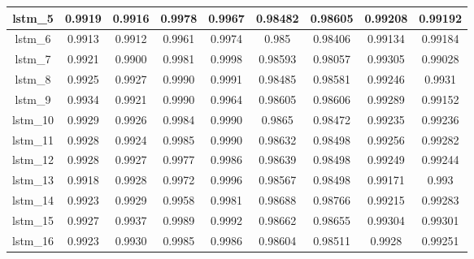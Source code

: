 \begin{table}[p]
\begin{tabular} {|c|c|c|c|c|c|c|c|c| }
        lstm\_5  & 0.9919                        & 0.9916                         & 0.9978                      & 0.9967                  & 0.98482 & 0.98605 & 0.99208 & 0.99192 \\ \hline
        lstm\_6  & 0.9913                        & 0.9912                         & 0.9961                      & 0.9974                  & 0.985   & 0.98406 & 0.99134 & 0.99184 \\ \hline
        lstm\_7  & 0.9921                        & 0.9900                         & 0.9981                      & 0.9998                  & 0.98593 & 0.98057 & 0.99305 & 0.99028 \\ \hline
        lstm\_8  & 0.9925                        & 0.9927                         & 0.9990                      & 0.9991                  & 0.98485 & 0.98581 & 0.99246 & 0.9931  \\ \hline
        lstm\_9  & 0.9934                        & 0.9921                         & 0.9990                      & 0.9964                  & 0.98605 & 0.98606 & 0.99289 & 0.99152 \\ \hline
        lstm\_10 & 0.9929                        & 0.9926                         & 0.9984                      & 0.9990                  & 0.9865  & 0.98472 & 0.99235 & 0.99236 \\ \hline
        lstm\_11 & 0.9928                        & 0.9924                         & 0.9985                      & 0.9990                  & 0.98632 & 0.98498 & 0.99256 & 0.99282 \\ \hline
        lstm\_12 & 0.9928                        & 0.9927                         & 0.9977                      & 0.9986                  & 0.98639 & 0.98498 & 0.99249 & 0.99244 \\ \hline
        lstm\_13 & 0.9918                        & 0.9928                         & 0.9972                      & 0.9996                  & 0.98567 & 0.98498 & 0.99171 & 0.993   \\ \hline
        lstm\_14 & 0.9923                        & 0.9929                         & 0.9958                      & 0.9981                  & 0.98688 & 0.98766 & 0.99215 & 0.99283 \\ \hline
        lstm\_15 & 0.9927                        & 0.9937                         & 0.9989                      & 0.9992                  & 0.98662 & 0.98655 & 0.99304 & 0.99301 \\ \hline
        lstm\_16 & 0.9923                        & 0.9930                         & 0.9985                      & 0.9986                  & 0.98604 & 0.98511 & 0.9928  & 0.99251 \\ \hline

\end{tabular}
\end{table}
